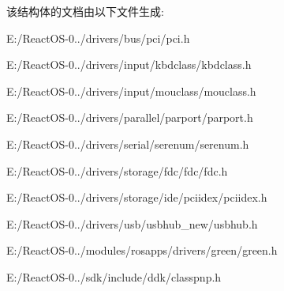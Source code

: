 该结构体的文档由以下文件生成\+:\begin{DoxyCompactItemize}
\item 
E\+:/\+React\+O\+S-\/0../drivers/bus/pci/pci.\+h\item 
E\+:/\+React\+O\+S-\/0../drivers/input/kbdclass/kbdclass.\+h\item 
E\+:/\+React\+O\+S-\/0../drivers/input/mouclass/mouclass.\+h\item 
E\+:/\+React\+O\+S-\/0../drivers/parallel/parport/parport.\+h\item 
E\+:/\+React\+O\+S-\/0../drivers/serial/serenum/serenum.\+h\item 
E\+:/\+React\+O\+S-\/0../drivers/storage/fdc/fdc/fdc.\+h\item 
E\+:/\+React\+O\+S-\/0../drivers/storage/ide/pciidex/pciidex.\+h\item 
E\+:/\+React\+O\+S-\/0../drivers/usb/usbhub\+\_\+new/usbhub.\+h\item 
E\+:/\+React\+O\+S-\/0../modules/rosapps/drivers/green/green.\+h\item 
E\+:/\+React\+O\+S-\/0../sdk/include/ddk/classpnp.\+h\end{DoxyCompactItemize}
